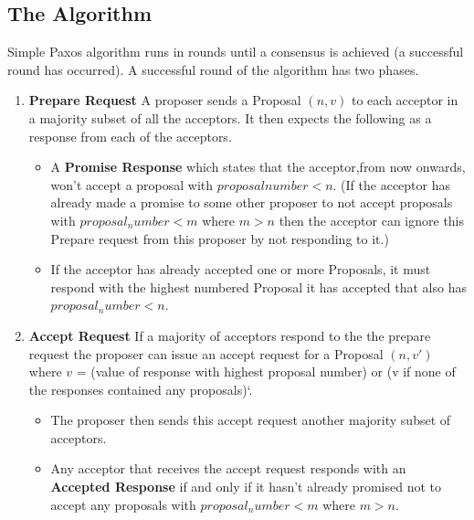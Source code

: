 \subsection{The Algorithm}
Simple Paxos algorithm runs in rounds until a consensus is achieved
(a successful round has occurred). A successful round of the algorithm has two phases.

\begin{enumerate}
  \item \textbf{Prepare Request} A proposer sends a Proposal $(n, v)$ to each acceptor in
    a majority subset of all the acceptors. It then expects the following as a
    response from each of the acceptors.
    \begin{itemize}
      \item A \textbf{Promise Response} which states that the acceptor,from now onwards,
        won't accept a proposal with $proposal number < n$. (If the acceptor has
        already made a promise to some other proposer to not accept proposals with
        $proposal_number < m$ where $m > n$ then the acceptor can ignore this
        Prepare request from this proposer by not responding to it.)
      \item If the acceptor has already accepted one or more Proposals, it must
        respond with the highest numbered Proposal it has accepted that also has
        $proposal_number < n$.
    \end{itemize}
  \item \textbf{Accept Request} If a majority of acceptors respond to the the prepare request
    the proposer can issue an accept request for a Proposal $(n, v')$ where
    $v$ = (value of response with highest proposal number) or
    (v if none of the responses contained any proposals)`.
    \begin{itemize}
      \item The proposer then sends this accept request another majority
        subset of acceptors.
      \item Any acceptor that receives the accept request responds with an
        \textbf{Accepted Response} if and only if it hasn't already promised not to
        accept any proposals with $proposal_number < m$ where $m > n$.
    \end{itemize}
\end{enumerate}


